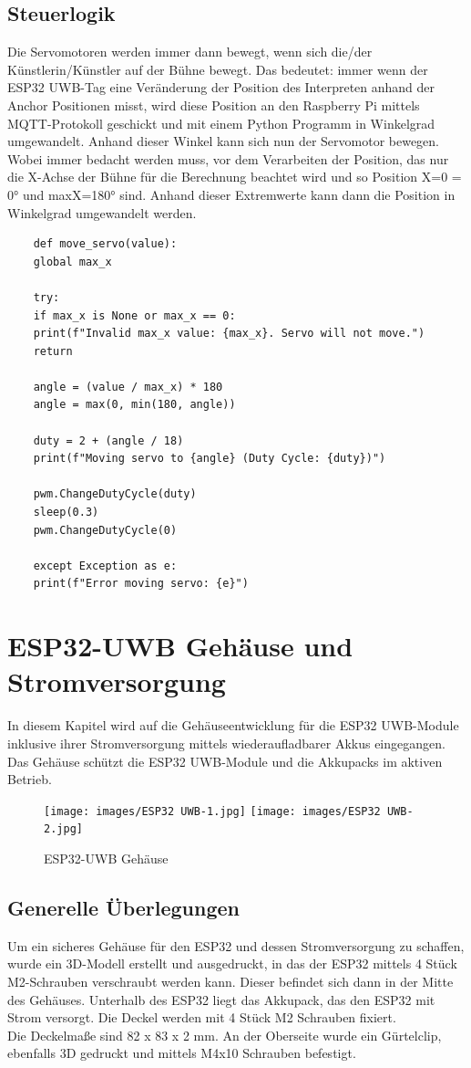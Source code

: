 \newpage
\subsection{Steuerlogik} \label{Steuerlogik}
Die Servomotoren werden immer dann bewegt, wenn sich die/der Künstlerin/Künstler auf der Bühne bewegt. Das bedeutet: immer wenn der ESP32 UWB-Tag eine Veränderung der Position des Interpreten anhand der Anchor Positionen misst, wird diese Position an den Raspberry Pi mittels MQTT-Protokoll geschickt und mit einem Python Programm in Winkelgrad umgewandelt. Anhand dieser Winkel kann sich nun der Servomotor bewegen. Wobei immer bedacht werden muss, vor dem Verarbeiten der Position, das nur die X-Achse der Bühne für die Berechnung beachtet wird und so Position X=0 = 0° und maxX=180° sind. Anhand dieser Extremwerte kann dann die Position in Winkelgrad umgewandelt werden.

\begin{lstlisting}
	def move_servo(value):
	global max_x
	
	try:
	if max_x is None or max_x == 0:
	print(f"Invalid max_x value: {max_x}. Servo will not move.")
	return
	
	angle = (value / max_x) * 180
	angle = max(0, min(180, angle)) 
	
	duty = 2 + (angle / 18)
	print(f"Moving servo to {angle} (Duty Cycle: {duty})")
	
	pwm.ChangeDutyCycle(duty)
	sleep(0.3)
	pwm.ChangeDutyCycle(0) 
	
	except Exception as e:
	print(f"Error moving servo: {e}")
\end{lstlisting}

\newpage
\section{ESP32-UWB Gehäuse und Stromversorgung}
In diesem Kapitel wird auf die Gehäuseentwicklung für die ESP32 UWB-Module inklusive ihrer Stromversorgung mittels wiederaufladbarer Akkus eingegangen. Das Gehäuse schützt die ESP32 UWB-Module und die Akkupacks im aktiven Betrieb.

\begin{figure}[H]
	\centering
	\texttt{[image: images/ESP32 UWB-1.jpg]}
	\texttt{[image: images/ESP32 UWB-2.jpg]}
	\caption[ESP32-UWB Gehäuse]{ESP32-UWB Gehäuse}
	\label{fig:ESP32-UWB Gehäuse V2}
\end{figure}

\subsection{Generelle Überlegungen}
Um ein sicheres Gehäuse für den ESP32 und dessen Stromversorgung zu schaffen, wurde ein 3D-Modell erstellt und ausgedruckt, in das der ESP32 mittels 4 Stück M2-Schrauben verschraubt werden kann. Dieser befindet sich dann in der Mitte des Gehäuses. Unterhalb des ESP32 liegt das Akkupack, das den ESP32 mit Strom versorgt.
Die Deckel werden mit 4 Stück M2 Schrauben fixiert. \\
Die Deckelmaße sind 82 x 83 x 2 mm. An der Oberseite wurde ein Gürtelclip, ebenfalls 3D gedruckt und mittels M4x10 Schrauben befestigt.

